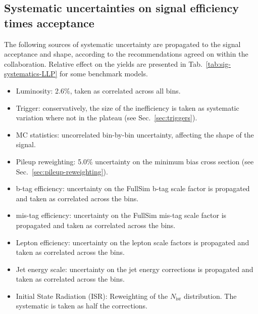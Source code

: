 \clearpage
\subsection{Systematic uncertainties on signal efficiency times acceptance}
\label{sec:sig-syst-LLP}

The following sources of systematic uncertainty are propagated to the
signal acceptance and shape, according to the recommendations agreed
on within the collaboration. Relative effect on the yields are
presented in Tab.~\ref{tab:sig-systematics-LLP} for some benchmark
models.

\begin{itemize}
    \item Luminosity: 2.6\%, taken as correlated across all bins.
    \item Trigger: conservatively, the size of the inefficiency is taken as
        systematic variation where not in the plateau (see Sec.~\ref{sec:triggers}).
    \item MC statistics:  uncorrelated bin-by-bin uncertainty, affecting the
        shape of the signal.
    \item Pileup reweighting: 5.0\% uncertainty on the minimum bias cross section
        (see Sec.~\ref{sec:pileup-reweighting}).
    \item b-tag efficiency: uncertainty on the FullSim b-tag scale
        factor is propagated and taken as correlated across the bins.
    \item mis-tag efficiency: uncertainty on the FullSim mis-tag scale
        factor is propagated and taken as correlated across the bins.
    \item Lepton efficiency: uncertainty on the lepton scale factors is
        propagated and taken as correlated across the bins.
    \item Jet energy scale: uncertainty on the jet energy corrections is
        propagated and taken as correlated across the bins.
    \item Initial State Radiation (ISR): Reweighting of the $N_{\text{isr}}$
        distribution. The systematic is taken as half the corrections.
\end{itemize}


